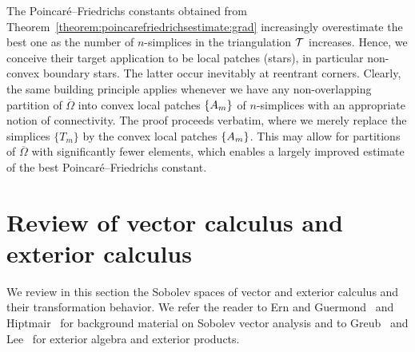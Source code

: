 \documentclass[10pt,a4paper]{article}
\begin{document}
\begin{remark}
    The Poincar\'e--Friedrichs constants obtained from Theorem~\ref{theorem:poincarefriedrichsestimate:grad} increasingly overestimate the best one as the number of $n$-simplices in the triangulation ${\mathcal T}$ increases. 
    Hence, we conceive their target application to be local patches (stars), in particular non-convex boundary stars. 
    The latter occur inevitably at reentrant corners. Clearly, the same building principle applies whenever we have any non-overlapping partition of $\overline \Omega$ into convex local patches $\{ A_m \}$ of $n$-simplices with an appropriate notion of connectivity. 
    The proof proceeds verbatim, where we merely replace the simplices $\{ T_{m} \}$ by the convex local patches $\{ A_m \}$. 
    This may allow for partitions of $\overline \Omega$ with significantly fewer elements, which enables a largely improved estimate of the best Poincar\'e--Friedrichs constant. 
\end{remark}



    























\section{Review of vector calculus and exterior calculus}\label{section:calculus}


We review in this section the Sobolev spaces of vector and exterior calculus and their transformation behavior. We refer the reader to Ern and Guermond~\cite{ern2021finite} and Hiptmair~\cite{hiptmair2002finite} for background material on Sobolev vector analysis and to Greub~\cite{greub1967multilinear} and Lee~\cite{lee2012smooth} for exterior algebra and exterior products. 
\end{document}
